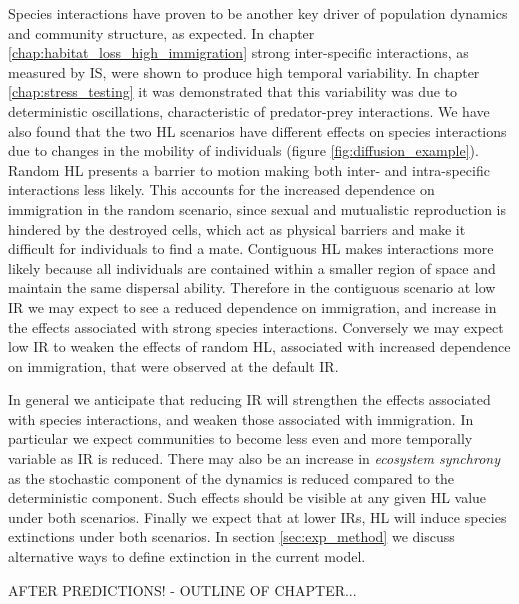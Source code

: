 Species interactions have proven to be another key driver of population dynamics and community structure, as expected. In chapter \ref{chap:habitat_loss_high_immigration} strong inter-specific interactions, as measured by IS, were shown to produce high temporal variability. In chapter \ref{chap:stress_testing} it was demonstrated that this variability was due to deterministic oscillations, characteristic of predator-prey interactions. We have also found that the two HL scenarios have different effects on species interactions due to changes in the mobility of individuals (figure \ref{fig:diffusion_example}). Random HL presents a barrier to motion making both inter- and intra-specific interactions less likely. This accounts for the increased dependence on immigration in the random scenario, since sexual and mutualistic reproduction is hindered by the destroyed cells, which act as physical barriers and make it difficult for individuals to find a mate. Contiguous HL makes interactions more likely because all individuals are contained within a smaller region of space and maintain the same dispersal ability. Therefore in the contiguous scenario at low IR we may expect to see a reduced dependence on immigration, and increase in the effects associated with strong species interactions. Conversely we may expect low IR to weaken the effects of random HL, associated with increased dependence on immigration, that were observed at the default IR.   

In general we anticipate that reducing IR will strengthen the effects associated with species interactions, and weaken those associated with immigration. In particular we expect communities to become less even and more temporally variable as IR is reduced. There may also be an increase in \emph{ecosystem synchrony} as the stochastic component of the dynamics is reduced compared to the deterministic component. Such effects should be visible at any given HL value under both scenarios. Finally we expect that at lower IRs, HL will induce species extinctions under both scenarios. In section \ref{sec:exp_method} we discuss alternative ways to define extinction in the current model.

AFTER PREDICTIONS! - OUTLINE OF CHAPTER...


%


